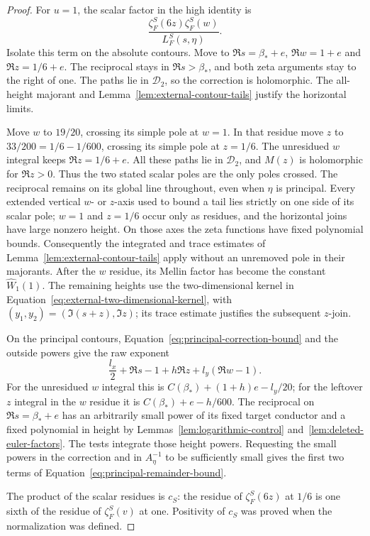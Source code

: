 \documentclass[11pt,a4paper]{article}
\numberwithin{equation}{section}
\numberwithin{figure}{section}
\theoremstyle{definition}
\theoremstyle{remark}
\begin{document}
\begin{proof}
For $u=1$, the scalar factor in the high identity is
\[
 \frac{\zeta_F^S(6z)\zeta_F^S(w)}{L_F^S(s,\eta)}.
\]
Isolate this term on the absolute contours.  Move to
$\Re s=\beta_*+e$, $\Re w=1+e$ and $\Re z=1/6+e$.
The reciprocal stays in $\Re s>\beta_*$, and both zeta arguments stay
to the right of one.  The paths lie in $\mathcal D_2$, so the correction
is holomorphic.  The all-height majorant and
Lemma~\ref{lem:external-contour-tails} justify the horizontal limits.

Move $w$ to $19/20$, crossing its simple pole at $w=1$.  In that residue
move $z$ to $33/200=1/6-1/600$, crossing its simple pole at $z=1/6$.
The unresidued $w$ integral keeps $\Re z=1/6+e$.  All these paths lie in
$\mathcal D_2$, and $M(z)$ is holomorphic for $\Re z>0$.
Thus the two stated scalar poles are the only poles crossed.  The reciprocal
remains on its global line throughout, even when $\eta$ is principal.
Every extended vertical $w$- or $z$-axis used to bound a tail lies strictly
on one side of its scalar pole; $w=1$ and $z=1/6$ occur only as residues,
and the horizontal joins have large nonzero height.  On those axes the
zeta functions have fixed polynomial bounds.  Consequently the integrated
and trace estimates of Lemma~\ref{lem:external-contour-tails} apply without
an unremoved pole in their majorants.
After the $w$ residue, its Mellin factor has become the constant
$\widehat W_1(1)$.  The remaining heights use the two-dimensional kernel
in Equation~\eqref{eq:external-two-dimensional-kernel}, with
$(y_1,y_2)=(\Im(s+z),\Im z)$; its trace estimate justifies the subsequent
$z$-join.

On the principal contours, Equation~\eqref{eq:principal-correction-bound}
and the outside powers give the raw exponent
\[
 \frac{l_x}{2}+\Re s-1+h\Re z+l_y(\Re w-1).
\]
For the unresidued $w$ integral this is
$C(\beta_*)+(1+h)e-l_y/20$; for the leftover $z$ integral in the
$w$ residue it is $C(\beta_*)+e-h/600$.  The reciprocal on
$\Re s=\beta_*+e$ has an arbitrarily small power of its fixed target
conductor and a fixed polynomial in height by
Lemmas~\ref{lem:logarithmic-control} and~\ref{lem:deleted-euler-factors}.
The tests integrate those height powers.  Requesting the small powers in
the correction and in $A_\eta^{-1}$ to be sufficiently small gives the
first two terms of Equation~\eqref{eq:principal-remainder-bound}.

The product of the scalar residues is $c_S$: the residue of
$\zeta_F^S(6z)$ at $1/6$ is one sixth of the residue of $\zeta_F^S(v)$
at one.  Positivity of $c_S$ was proved when the normalization was defined.


\end{proof}
\end{document}
